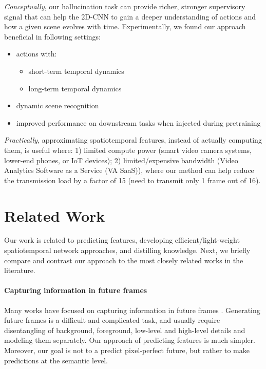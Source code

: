 \documentclass[10pt,twocolumn,letterpaper]{article}
\begin{document}
\textit{Conceptually}, our hallucination task can provide richer, stronger supervisory signal that can help the 2D-CNN to gain a deeper understanding of actions and how a given scene evolves with time. Experimentally, we found our approach beneficial in following settings: 
\begin{itemize}[noitemsep]
\item actions with:
\begin{itemize}[noitemsep]
\item short-term temporal dynamics
\item long-term temporal dynamics
\end{itemize}
\item dynamic scene recognition
\item improved performance on downstream tasks when injected during pretraining
\end{itemize}
\textit{Practically}, approximating spatiotemporal features, instead of actually computing them, is useful where: 1) limited compute power (smart video camera systems, lower-end phones, or IoT devices); 2) limited/expensive bandwidth (Video Analytics Software as a Service (VA SaaS)), where our method can help reduce the transmission load by a factor of 15 (need to transmit only 1 frame out of 16).  \section{Related Work}
Our work is related to predicting features, developing efficient/light-weight spatiotemporal network approaches, and distilling knowledge. Next, we briefly compare and contrast our approach to the most closely related works in the literature.
\paragraph{Capturing information in future frames} 
Many works have focused on capturing information in future frames \cite{yuen2010, kitani2012activity, walker2014patch, walker, pintea2014deja, finn2016unsupervised,  walker2016uncertain, koppula2015anticipating, cv_anticipating, vondrick_gen_dyna, bilen2016dynamic, vondrick_adv_xform}. Generating future frames is a difficult and complicated task, and usually require disentangling of background, foreground, low-level and high-level details and modeling them separately. Our approach of predicting features is much simpler. Moreover, our goal is not to a predict pixel-perfect future, but rather to make predictions at the semantic level.
\end{document}
